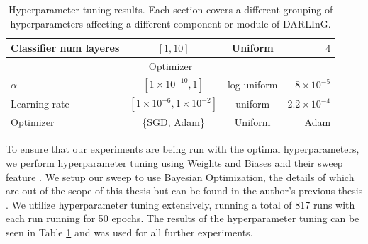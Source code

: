 \begin{table}
{\begin{tabular}{@{}lccr@{}}
		Classifier num layeres         & $[1, 10]$                              & Uniform            & $4$                  \\ \midrule
		\multicolumn{4}{c}{Optimizer}                                                                                       \\ \midrule
		$\alpha$                       & $[1 \times 10^{-10}, 1]$               & log uniform        & $8 \times 10^{-5}$   \\
		Learning rate                  & $[1 \times 10^{-6}, 1 \times 10^{-2}]$ & uniform            & $2.2 \times 10^{-4}$ \\
		Optimizer                      & \{SGD, Adam\}                          & Uniform            & Adam                 \\ \bottomrule
	\end{tabular}
	}
	\caption{Hyperparameter tuning results. Each section covers a different grouping of hyperparameters affecting a different component or module of DARLInG.}
	\label{tab:hpoptim-results}
\end{table}

To ensure that our experiments are being run with the optimal hyperparameters, we perform hyperparameter tuning using Weights and Biases and their sweep feature \cite{wandb}.
We setup our sweep to use Bayesian Optimization, the details of which are out of the scope of this thesis but can be found in the author's previous thesis \cite{satyawan2019semantic}.
We utilize hyperparameter tuning extensively, running a total of 817 runs with each run running for 50 epochs.
The results of the hyperparameter tuning can be seen in Table \ref{tab:hpoptim-results} and was used for all further experiments.

